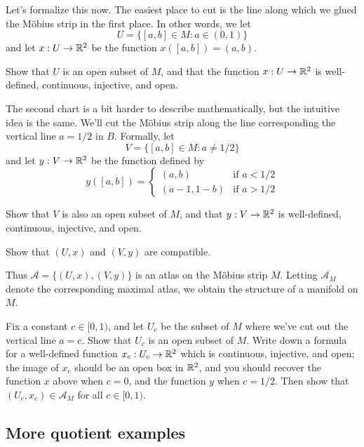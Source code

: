 Let's formalize this now. The easiest place to cut is the line along which we glued the M\"obius strip in the first place. In other words, we let \[ U = \{ [a, b] \in M : a \in (0,1) \} \] 
and let $x : U \to \mathbb{R}^2$ be the function $x([a,b]) = (a, b)$.

\begin{exercise}
	Show that $U$ is an open subset of $M$, and that the function $x : U \to \mathbb{R}^2$ is well-defined, continuous, injective, and open. 
\end{exercise}

The second chart is a bit harder to describe mathematically, but the intuitive idea is the same. We'll cut the M\"obius strip along the line corresponding the vertical line $a = 1/2$ in $B$. Formally, let \[ V = \{ [a, b] \in M : a \neq 1/2 \} \] and let $y : V \to  \mathbb{R}^2$ be the function defined by 
\[ y([a,b]) = \begin{cases} (a, b) & \text{if } a < 1/2 \\ (a-1, 1-b) & \text{if } a > 1/2 \end{cases} \]

\begin{exercise}
	Show that $V$ is also an open subset of $M$, and that $y : V \to \mathbb{R}^2$ is well-defined, continuous, injective, and open. 
\end{exercise}

\begin{exercise}
	Show that $(U, x)$ and $(V, y)$ are compatible.
\end{exercise}

Thus $\mathscr{A} = \{(U, x), (V, y)\}$ is an atlas on the M\"obius strip $M$. Letting $\mathscr{A}_M$ denote the corresponding maximal atlas, we obtain the structure of a manifold on $M$.

\begin{exercise}
	Fix a constant $c \in [0,1)$, and let $U_c$ be the subset of $M$ where we've cut out the vertical line $a = c$. Show that $U_c$ is an open subset of $M$. Write down a formula for a well-defined function $x_c : U_c \to \mathbb{R}^2$ which is continuous, injective, and open; the image of $x_c$ should be an open box in $\mathbb{R}^2$, and you should recover the function $x$ above when $c = 0$, and the function $y$ when $c = 1/2$. Then show that $(U_c, x_c) \in \mathscr{A}_M$ for all $c \in [0,1)$. 
\end{exercise}

\subsection{More quotient examples}

